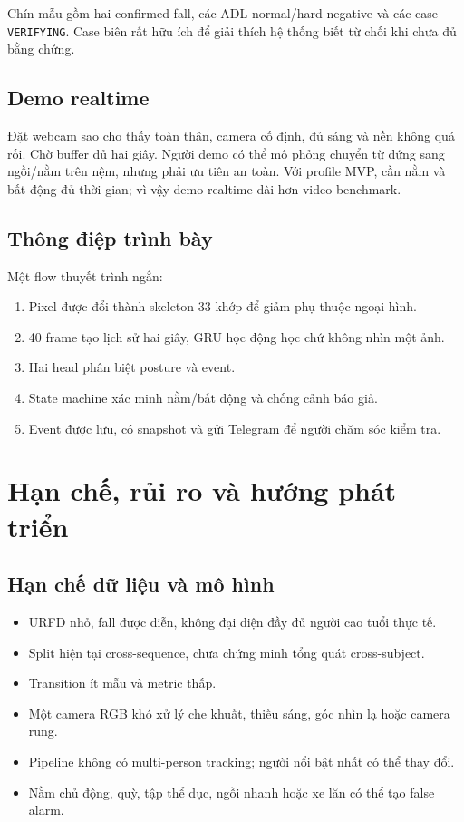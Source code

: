 \documentclass[12pt,a4paper,oneside]{report}
\newcommand{\code}[1]{\texttt{#1}}
\begin{document}
Chín mẫu gồm hai confirmed fall, các ADL normal/hard negative và các case
\code{VERIFYING}. Case biên rất hữu ích để giải thích hệ thống biết từ chối khi
chưa đủ bằng chứng.

\section{Demo realtime}

Đặt webcam sao cho thấy toàn thân, camera cố định, đủ sáng và nền không quá rối.
Chờ buffer đủ hai giây. Người demo có thể mô phỏng chuyển từ đứng sang ngồi/nằm
trên nệm, nhưng phải ưu tiên an toàn. Với profile MVP, cần nằm và bất động đủ
thời gian; vì vậy demo realtime dài hơn video benchmark.

\section{Thông điệp trình bày}

Một flow thuyết trình ngắn:

\begin{enumerate}
  \item Pixel được đổi thành skeleton 33 khớp để giảm phụ thuộc ngoại hình.
  \item 40 frame tạo lịch sử hai giây, GRU học động học chứ không nhìn một ảnh.
  \item Hai head phân biệt posture và event.
  \item State machine xác minh nằm/bất động và chống cảnh báo giả.
  \item Event được lưu, có snapshot và gửi Telegram để người chăm sóc kiểm tra.
\end{enumerate}

\chapter{Hạn chế, rủi ro và hướng phát triển}

\section{Hạn chế dữ liệu và mô hình}

\begin{itemize}
  \item URFD nhỏ, fall được diễn, không đại diện đầy đủ người cao tuổi thực tế.
  \item Split hiện tại cross-sequence, chưa chứng minh tổng quát cross-subject.
  \item Transition ít mẫu và metric thấp.
  \item Một camera RGB khó xử lý che khuất, thiếu sáng, góc nhìn lạ hoặc camera rung.
  \item Pipeline không có multi-person tracking; người nổi bật nhất có thể thay đổi.
  \item Nằm chủ động, quỳ, tập thể dục, ngồi nhanh hoặc xe lăn có thể tạo false alarm.
\end{itemize}
\end{document}
